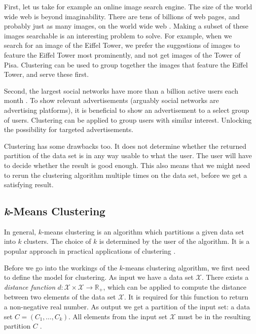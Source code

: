 \documentclass[../main.tex]{subfiles}
\begin{document}
First, let us take for example an online image search engine.
The size of the world wide web is beyond imaginability.
There are tens of billions of web pages, and probably just as many images, on the world wide web \cite{WwwSize}.
Making a subset of these images searchable is an interesting problem to solve.
For example, when we search for an image of the Eiffel Tower,
we prefer the suggestions of images to feature the Eiffel Tower most prominently,
and not get images of the Tower of Pisa.
Clustering can be used to group together the images that feature the Eiffel Tower, and serve these first.


Second, the largest social networks have more than a billion active users each month \cite{SocialNetworkSize}.
To show relevant advertisements (arguably social networks are advertising platforms),
it is beneficial to show an advertisement to a select group of users.
Clustering can be applied to group users with similar interest.
Unlocking the possibility for targeted advertisements.


Clustering has some drawbacks too.
It does not determine whether the returned partition of the data set is in any way usable to what the user.
The user will have to decide whether the result is good enough.
This also means that we might need to rerun the clustering algorithm multiple times on the data set,
before we get a satisfying result.


\subsection{\emph{k}-Means Clustering}
\label{sec:III_k-means}


In general, $k$-means clustering is an algorithm which partitions a given data set into $k$ clusters.
The choice of $k$ is determined by the user of the algorithm.
It is a popular approach in practical applications of clustering \cite[Chapter~22]{Shalev2014understanding}.

Before we go into the workings of the $k$-means clustering algorithm, we first need to define the model for clustering.
As input we have a data set $\mathcal{X}$.
There exists a \emph{distance function} $d : \mathcal{X} \times \mathcal{X} \to \mathbb{R}_{+}$,
which can be applied to compute the distance between two elements of the data set $\mathcal{X}$.
It is required for this function to return a non-negative real number.
As output we get a partition of the input set: a data set $C = (C_{1}, \ldots, C_{k})$.
All elements from the input set $\mathcal{X}$ must be in the resulting partition $C$
\cite[Chapter~22]{Shalev2014understanding}.
\end{document}
